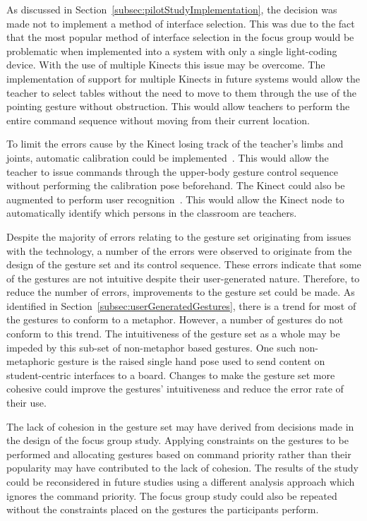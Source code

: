 \documentclass[link]{IWCOMP}
\begin{document}
As discussed in Section~\ref{subsec:pilotStudyImplementation}, the decision was made not to implement a method of interface selection.
This was due to the fact that the most popular method of interface selection in the focus group would be problematic when implemented into a system with only a single light-coding device.
With the use of multiple Kinects this issue may be overcome. 
The implementation of support for multiple Kinects in future systems would allow the teacher to select tables without the need to move to them through the use of the pointing gesture without obstruction.
This would allow teachers to perform the entire command sequence without moving from their current location.

To limit the errors cause by the Kinect losing track of the teacher's limbs and joints, automatic calibration could be implemented~\cite{Bellmore2011}.
This would allow the teacher to issue commands through the upper-body gesture control sequence without performing the calibration pose beforehand.
The Kinect could also be augmented to perform user recognition~\cite{Leyvand2011}.
This would allow the Kinect node to automatically identify which persons in the classroom are teachers.

Despite the majority of errors relating to the gesture set originating from issues with the technology, a number of the errors were observed to originate from the design of the gesture set and its control sequence.
These errors indicate that some of the gestures are not intuitive despite their user-generated nature.
Therefore, to reduce the number of errors, improvements to the gesture set could be made.
As identified in Section~\ref{subsec:userGeneratedGestures}, there is a trend for most of the gestures to conform to a metaphor.
However, a number of gestures do not conform to this trend.
The intuitiveness of the gesture set as a whole may be impeded by this sub-set of non-metaphor based gestures.
One such non-metaphoric gesture is the raised single hand pose used to send content on student-centric interfaces to a board.
Changes to make the gesture set more cohesive could improve the gestures' intuitiveness and reduce the error rate of their use.

The lack of cohesion in the gesture set may have derived from decisions made in the design of the focus group study.
Applying constraints on the gestures to be performed and allocating gestures based on command priority rather than their popularity may have contributed to the lack of cohesion.
The results of the study could be reconsidered in future studies using a different analysis approach which ignores the command priority.
The focus group study could also be repeated without the constraints placed on the gestures the participants perform.
\end{document}
